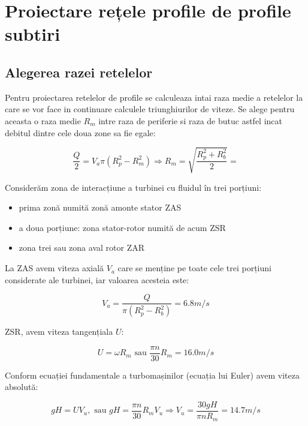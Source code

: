 \chapter{Proiectare rețele profile de profile subtiri}\label{chapter:proiectare}

\section{Alegerea razei retelelor}

Pentru proiectarea retelelor de profile se calculeaza intai raza medie a retelelor la care se vor face in continuare calculele triunghiurilor de viteze. Se alege pentru aceasta o raza medie $R_m$ intre raza de periferie si raza de butuc astfel incat debitul dintre cele doua zone sa fie egale:

\begin{equation}
\frac{Q}{2} = V_a \pi (R_p^2 - R_m^2) \Rightarrow{} R_m = \sqrt{\frac{R_p^2 + R_b^2}{2}} = 
\end{equation}


Considerăm zona de interacțiune a turbinei cu fluidul în trei porțiuni:
\begin{itemize}
	\item prima zonă numită zonă amonte stator ZAS
	\item a doua porțiune: zona stator-rotor numită de acum ZSR
	\item zona trei sau zona aval rotor ZAR
\end{itemize}

La ZAS avem viteza axială $V_{a}$ care se menține pe toate cele trei porțiuni considerate ale turbinei, iar valoarea acesteia este:

\begin{equation}
V_a=\frac{Q}{\pi(R_{p}^2-R_{b}^2)}=6.8\si{m/s}
\end{equation}

 ZSR, avem viteza tangențiala $U$:

\begin{equation}
U=\omega R_m \text{ sau } \frac{\pi n}{30} R_m=16.0\si{m/s}
\end{equation}

Conform ecuației fundamentale a turbomașinilor (ecuația lui Euler) avem viteza absolută:

\begin{equation}
gH=UV_{u}, \text{ sau } gH=\frac{\pi n}{30} R_m V_{u} \Rightarrow V_{u} = \frac{30gH}{\pi n R_m} = 14.7\si{m/s}
\end{equation}


